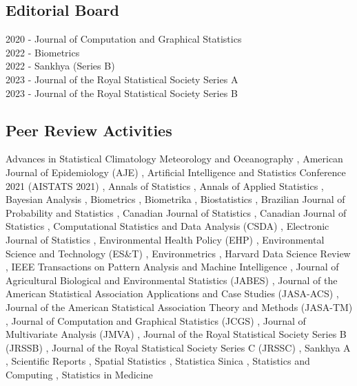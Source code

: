 \documentclass[12pt]{article}
\begin{document}
\smallskip

\subsection*{Editorial Board} 
2020 - \quad \quad Journal of Computation and Graphical Statistics\\
2022 - \quad \quad Biometrics \\
2022 - \quad \quad Sankhya (Series B) \\
2023 - \quad \quad Journal of the Royal Statistical Society Series A \\
2023 - \quad \quad Journal of the Royal Statistical Society Series B 

\subsection*{Peer Review Activities}


Advances in Statistical Climatology Meteorology and Oceanography%
, American Journal of Epidemiology (AJE)%
,  Artificial Intelligence and Statistics Conference 2021 (AISTATS 2021)%
, Annals of Statistics%
, Annals of Applied Statistics%
, Bayesian Analysis%
, Biometrics%
, Biometrika%
, Biostatistics%
, Brazilian Journal of Probability and Statistics%
, Canadian Journal of Statistics%
, Canadian Journal of Statistics%
, Computational Statistics and Data Analysis (CSDA)%
, Electronic Journal of Statistics%
, Environmental Health Policy (EHP)%
, Environmental Science and Technology (ES\&T)%
, Environmetrics%
, Harvard Data Science Review%
, IEEE Transactions on Pattern Analysis and Machine Intelligence%
, Journal of Agricultural Biological and Environmental Statistics (JABES)%
, Journal of the American Statistical Association Applications and Case Studies (JASA-ACS)%
, Journal of the American Statistical Association Theory and Methods (JASA-TM)%
, Journal of Computation and Graphical Statistics (JCGS)%
, Journal of Multivariate Analysis (JMVA)%
, Journal of the Royal Statistical Society Series B (JRSSB)%
, Journal of the Royal Statistical Society Series C (JRSSC)%
, Sankhya A%
, Scientific Reports%
, Spatial Statistics%
, Statistica Sinica%
, Statistics and Computing%
, Statistics in Medicine%
\end{document}
